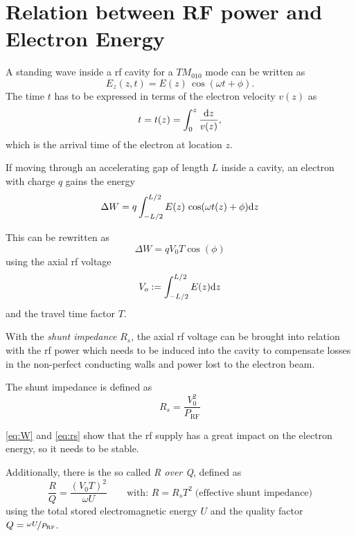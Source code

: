 \section{Relation between RF power and Electron Energy}
A standing wave inside a \gls{rf} cavity for a $TM_{010}$ mode can be written as
\begin{equation}
E_z(z,t) = E(z)\,\cos(\omega t + \phi).
\end{equation}
The time $t$ has to be expressed in terms of the electron velocity $v(z)$ as
\begin{equation}
t=t(z)=\int_{0}^{z} \frac{\text{d}{z}}{v(z)},
\end{equation}
which is the arrival time of the electron at location $z$.

If moving through an accelerating gap of length $L$ inside a cavity, an electron with charge $q$ gains the energy
\begin{equation}
\Delta W = q \int_{-L/2}^{L/2} E(z)\,\cos(\omega t(z) + \phi) \text{d}{z}
\end{equation}

This can be rewritten as
\begin{equation}\label{eq:W}
\Delta W = q V_0 T \cos(\phi)
\end{equation}
using the axial \gls{rf} voltage
\begin{equation}
V_o := \int_{-L/2}^{L/2} E(z) \text{d}{z}
\end{equation}
and the travel time factor $T$. \cite[p.~32]{Wangler2008}

With the \textit{shunt impedance} $R_s$, the axial \gls{rf} voltage can be brought into relation with the \gls{rf} power which needs to be induced into the cavity to compensate losses in the non-perfect conducting walls and power lost to the electron beam. \cite{burtRF}

The shunt impedance is defined as
\begin{equation}\label{eq:rs}
R_s = \frac{V^2_0}{P_{\text{RF}}} 
\end{equation}

\autoref{eq:W} and \autoref{eq:rs} show that the \gls{rf} supply has a great impact on the electron energy, so it needs to be stable.

Additionally, there is the so called \textit{R over Q}, defined as
\begin{equation}
\frac{R}{Q} = \frac{(V_0T)^2}{\omega U}\qquad \text{with: }R=R_s T^2\;\text{(effective shunt impedance)}
\end{equation}
using the total stored electromagnetic energy $U$ and the quality factor $Q=\nicefrac{\omega U}{P_{\text{RF}}}$.

